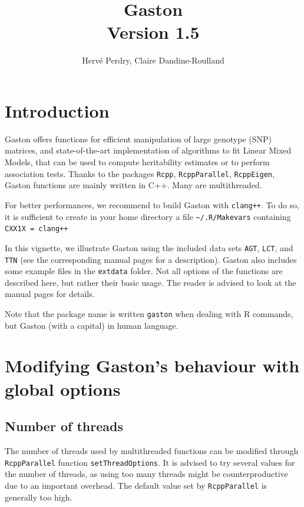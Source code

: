 \documentclass{article}
\title{{\bfseries Gaston}\\
       {\large Version 1.5}}
\author{Hervé Perdry, Claire Dandine-Roulland}
\begin{document}
\maketitle

\section*{Introduction}

  Gaston offers functions for efficient manipulation of 
  large genotype (SNP) matrices, and state-of-the-art implementation of algorithms
  to fit Linear Mixed Models, that can be used to compute heritability 
  estimates or to perform association tests.
  Thanks to the packages \verb!Rcpp!, \verb!RcppParallel!, \verb!RcppEigen!, Gaston
  functions are mainly written in C++. Many are multithreaded.

  For better performances, we recommend to build Gaston with \verb!clang++!.
  To do so, it is sufficient to create in your home directory
  a file \verb!~/.R/Makevars! containing \verb!CXX1X = clang++! 

  In this vignette, we illustrate Gaston using the included data sets \verb!AGT!, \verb!LCT!,
  and \verb!TTN! (see the corresponding manual pages for a description). 
  Gaston also includes some example files in the \verb!extdata! folder. 
  Not all options of the functions are described here, but rather their basic usage.
  The reader is advised to look at the manual pages for details.

  Note that the package name is written \verb!gaston! when dealing with R commands, 
  but Gaston (with a capital) in human language.

\section{Modifying Gaston's behaviour with global options}

\subsection{Number of threads}

  The number of threads used by multithreaded functions can be modified 
  through \verb!RcppParallel!  function \verb!setThreadOptions!.
  It is advised to try several values for the number of threads, as 
  using too many threads might be counterproductive due to an important
  overhead. The default value set by \verb!RcppParallel! is generally
  too high.
\end{document}
